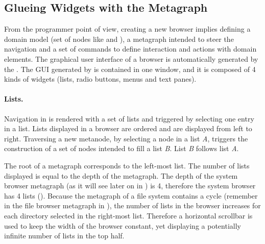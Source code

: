 \documentclass[a4paper,10pt,twoside]{book}
\begin{document}
\subsection{Glueing Widgets with the Metagraph}\label{widgets}
From the programmer point of view, creating a new browser implies defining a domain model (set of nodes like  and ), a metagraph intended to steer the navigation and a set of commands to define interaction and actions with domain elements. The graphical user interface of a browser is automatically generated by the \obf. The GUI generated by \obf is contained in one window, and it is composed of 4 kinds of widgets (lists, radio buttons, menus and text panes).



\paragraph{Lists.} Navigation in \obf is rendered with a set of lists and triggered by selecting one entry in a list. Lists displayed in a browser are ordered and are displayed from left to right. Traversing a new metanode, by selecting a node in a list \textit{A}, triggers the construction of a set of nodes intended to fill a list \textit{B}. List \textit{B} follows list \textit{A}.

The root of a metagraph corresponds to the left-most list. The number of lists displayed is equal to the depth of the metagraph. The depth of the system browser metagraph (as it will see later on in ) is 4, therefore the system browser has 4 lists (). Because the metagraph of a file system contains a cycle (remember   in the file browser metagraph in ), the number of lists in the browser increases for each directory selected in the right-most list. Therefore a horizontal scrollbar is used to keep the width of the browser constant, yet displaying a potentially infinite number of lists in the top half.
\end{document}
